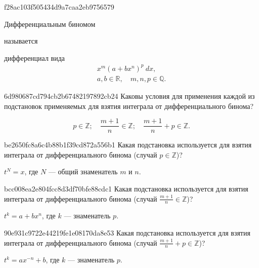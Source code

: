 \begin{note}{f28ac103f505434d9a7caa2eb9756579}
    \begin{icloze}{2}Дифференциальным биномом\end{icloze} называется \begin{icloze}{1}дифференциал вида
    \[
        \begin{gathered}
            x^{m} (a + b x^{n})^{p}\: dx, \\
            a, b \in \mathbb R, \quad m, n, p \in \mathbb Q.
        \end{gathered}
    \]\end{icloze}
\end{note}

\begin{note}{6d980687cd794cb2b67482197892cb24}
    Каковы условия для применения каждой из подстановок применяемых для взятия интеграла от дифференциального бинома?

    \begin{cloze}{1}
        \[
            p \in \mathbb Z; \quad
            \frac{m + 1}{n} \in \mathbb Z; \quad
            \frac{m + 1}{n} + p \in \mathbb Z.
        \]
    \end{cloze}
\end{note}

\begin{note}{be2650fc8a6c4b88b1f39cd872a556b1}
    Какая подстановка используется для взятия интеграла от дифференциального бинома (случай \({ p \in \mathbb Z }\))?

    \begin{cloze}{1}
        \({ t^{N} = x }\), где \({ N }\) --- общий знаменатель \({ m }\) и \({ n }\).
    \end{cloze}
\end{note}

\begin{note}{bcc008ea2e804fcc8d3df70bfe88cdc1}
    Какая подстановка используется для взятия интеграла от дифференциального бинома (случай \({ \frac{m + 1}{n} \in \mathbb Z }\))?

    \begin{cloze}{1}
        \({ t^{k} = a + bx^{n} }\), где \({ k }\) --- знаменатель \({ p }\).
    \end{cloze}
\end{note}

\begin{note}{90e931c9722e44219fe1e08170da8e53}
    Какая подстановка используется для взятия интеграла от дифференциального бинома (случай \({ \frac{m + 1}{n} + p \in \mathbb Z }\))?

    \begin{cloze}{1}
        \({ t^{k} = ax^{-n} + b }\), где \({ k }\) --- знаменатель \({ p }\).
    \end{cloze}
\end{note}

